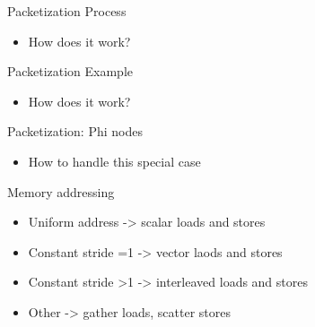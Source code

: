 
\begin{frame}{Packetization Process}

\begin{itemize}
    \item How does it work?
\end{itemize}

\end{frame}


\begin{frame}{Packetization Example}

\begin{itemize}
    \item How does it work?
\end{itemize}

\end{frame}


\begin{frame}{Packetization: Phi nodes}

\begin{itemize}
    \item How to handle this special case
\end{itemize}

\end{frame}


\begin{frame}{Memory addressing}

\begin{itemize}
    \item Uniform address -> scalar loads and stores
    \item Constant stride =1 -> vector laods and stores
    \item Constant stride >1 -> interleaved loads and stores
    \item Other -> gather loads, scatter stores
\end{itemize}

\end{frame}


